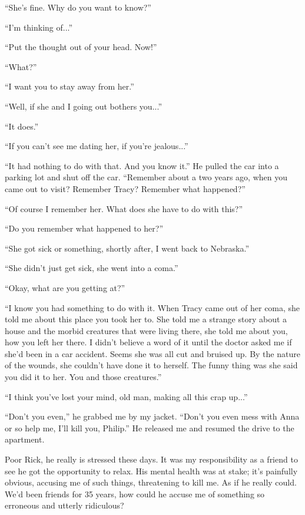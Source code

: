``She's fine. Why do you want to know?''

``I'm thinking of...''

``Put the thought out of your head. Now!''

``What?''

``I want you to stay away from her.''

``Well, if she and I going out bothers you...''

``It does.''

``If you can't see me dating her, if you're jealous...''

``It had nothing to do with that. And you know it.'' He pulled the car
into a parking lot and shut off the car. ``Remember about a two years
ago, when you came out to visit? Remember Tracy? Remember what
happened?''

``Of course I remember her. What does she have to do with this?''

``Do you remember what happened to her?''

``She got sick or something, shortly after, I went back to Nebraska.''

``She didn't just get sick, she went into a coma.''

``Okay, what are you getting at?''

``I know you had something to do with it. When Tracy came out of her
coma, she told me about this place you took her to. She told me a
strange story about a house and the morbid creatures that were living
there, she told me about you, how you left her there. I didn't believe a
word of it until the doctor asked me if she'd been in a car accident.
Seems she was all cut and bruised up. By the nature of the wounds, she
couldn't have done it to herself. The funny thing was she said you did
it to her. You and those creatures.''

``I think you've lost your mind, old man, making all this crap up...''

``Don't you even,'' he grabbed me by my jacket. ``Don't you even mess
with Anna or so help me, I'll kill you, Philip.'' He released me and
resumed the drive to the apartment.

Poor Rick, he really is stressed these days. It was my responsibility as
a friend to see he got the opportunity to relax. His mental health was
at stake; it's painfully obvious, accusing me of such things,
threatening to kill me. As if he really could. We'd been friends for 35
years, how could he accuse me of something so erroneous and utterly
ridiculous?

